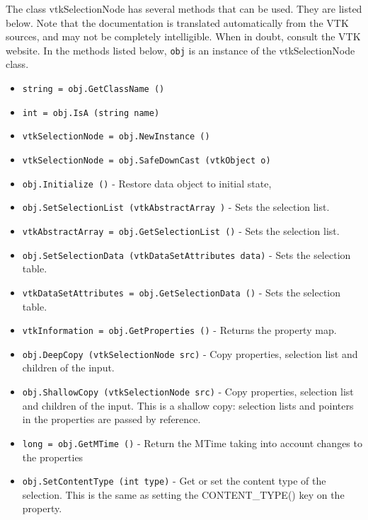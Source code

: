 The class vtkSelectionNode has several methods that can be used.
  They are listed below.
Note that the documentation is translated automatically from the VTK sources,
and may not be completely intelligible.  When in doubt, consult the VTK website.
In the methods listed below, \verb|obj| is an instance of the vtkSelectionNode class.
\begin{itemize}
\item  \verb|string = obj.GetClassName ()|

\item  \verb|int = obj.IsA (string name)|

\item  \verb|vtkSelectionNode = obj.NewInstance ()|

\item  \verb|vtkSelectionNode = obj.SafeDownCast (vtkObject o)|

\item  \verb|obj.Initialize ()| -  Restore data object to initial state,

\item  \verb|obj.SetSelectionList (vtkAbstractArray )| -  Sets the selection list.

\item  \verb|vtkAbstractArray = obj.GetSelectionList ()| -  Sets the selection list.

\item  \verb|obj.SetSelectionData (vtkDataSetAttributes data)| -  Sets the selection table.

\item  \verb|vtkDataSetAttributes = obj.GetSelectionData ()| -  Sets the selection table.

\item  \verb|vtkInformation = obj.GetProperties ()| -  Returns the property map.

\item  \verb|obj.DeepCopy (vtkSelectionNode src)| -  Copy properties, selection list and children of the input.

\item  \verb|obj.ShallowCopy (vtkSelectionNode src)| -  Copy properties, selection list and children of the input.
 This is a shallow copy: selection lists and pointers in the
 properties are passed by reference.

\item  \verb|long = obj.GetMTime ()| -  Return the MTime taking into account changes to the properties

\item  \verb|obj.SetContentType (int type)| -  Get or set the content type of the selection.
 This is the same as setting the CONTENT\_TYPE() key on the property.


\end{itemize}
